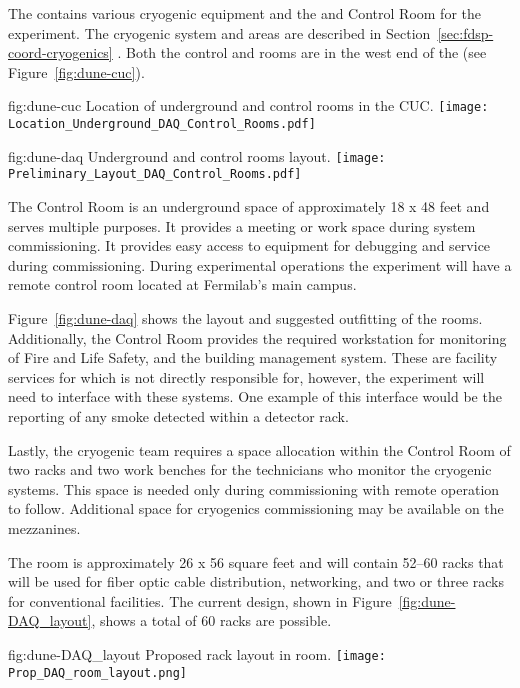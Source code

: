 The  contains various cryogenic equipment and the
 and Control Room for the  experiment.  The
cryogenic system and areas are described in
Section~\ref{sec:fdsp-coord-cryogenics} . Both the control and 
rooms are in the west end of the  (see
Figure~\ref{fig:dune-cuc}).
\begin{dunefigure}{fig:dune-cuc}
  {Location of underground  and control rooms in the CUC.}
  \texttt{[image: Location\_Underground\_DAQ\_Control\_Rooms.pdf]}
\end{dunefigure}
\begin{dunefigure}{fig:dune-daq}
  {Underground  and control rooms layout.}
  \texttt{[image: Preliminary\_Layout\_DAQ\_Control\_Rooms.pdf]}
\end{dunefigure}


The Control Room is an underground space of approximately 18 x 48 feet
and serves multiple purposes.  It provides a meeting or work space
during system commissioning. It provides easy access to 
equipment for debugging and service during commissioning.  During
experimental operations the  experiment will have a remote
control room located at Fermilab's main campus.

Figure~\ref{fig:dune-daq} shows the layout and suggested outfitting of
the rooms. Additionally, the Control Room provides the required
workstation for monitoring of Fire and Life Safety, and the building
management system.  These are facility services for which  is not
directly responsible for, however, the experiment will need to
interface with these systems.  One example of this interface would be
the reporting of any smoke detected within a detector rack.

Lastly, the cryogenic team requires a space allocation within the
Control Room of two racks and two work benches for the technicians who
monitor the cryogenic systems. This space is needed only during
commissioning with remote operation to follow. Additional space for
cryogenics commissioning may be available on the mezzanines.
       
The  room is approximately 26 x 56 square feet and will
contain 52--60 racks that will be used for fiber optic cable
distribution, networking,   and two or three
racks for conventional facilities.  The current design, shown in
Figure~\ref{fig:dune-DAQ_layout}, shows a total of 60 racks are
possible.
\begin{dunefigure}{fig:dune-DAQ_layout}
  {Proposed rack layout in  room.}
  \texttt{[image: Prop\_DAQ\_room\_layout.png]}
\end{dunefigure}
  


